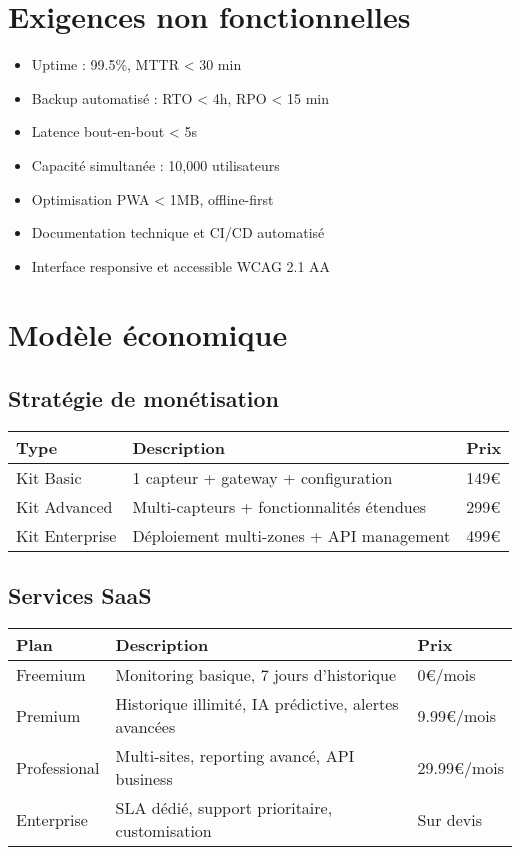 \documentclass[12pt,a4paper]{article}
\begin{document}
\section{Exigences non fonctionnelles}
\begin{itemize}
    \item Uptime : 99.5\%, MTTR < 30 min
    \item Backup automatisé : RTO < 4h, RPO < 15 min
    \item Latence bout-en-bout < 5s
    \item Capacité simultanée : 10,000 utilisateurs
    \item Optimisation PWA < 1MB, offline-first
    \item Documentation technique et CI/CD automatisé
    \item Interface responsive et accessible WCAG 2.1 AA
\end{itemize}

\section{Modèle économique}
\subsection{Stratégie de monétisation}
\begin{longtable}{|>{\raggedright}p{4cm}|>{\raggedright}p{6cm}|>{\raggedright}p{4cm}|}
\hline
\textbf{Type} & \textbf{Description} & \textbf{Prix} \\
\hline
Kit Basic & 1 capteur + gateway + configuration & 149€ \\
Kit Advanced & Multi-capteurs + fonctionnalités étendues & 299€ \\
Kit Enterprise & Déploiement multi-zones + API management & 499€ \\
\hline
\end{longtable}

\subsection{Services SaaS}
\begin{longtable}{|>{\raggedright}p{4cm}|>{\raggedright}p{6cm}|>{\raggedright}p{4cm}|}
\hline
\textbf{Plan} & \textbf{Description} & \textbf{Prix} \\
\hline
Freemium & Monitoring basique, 7 jours d'historique & 0€/mois \\
Premium & Historique illimité, IA prédictive, alertes avancées & 9.99€/mois \\
Professional & Multi-sites, reporting avancé, API business & 29.99€/mois \\
Enterprise & SLA dédié, support prioritaire, customisation & Sur devis \\
\hline
\end{longtable}
\end{document}
